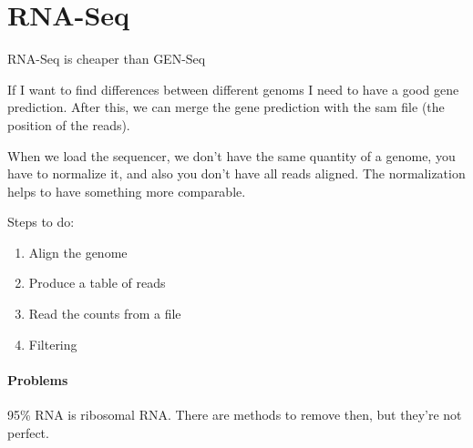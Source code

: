 \section{RNA-Seq}
RNA-Seq is cheaper than GEN-Seq


If I want to find differences between different genoms I need to have a good 
gene prediction. After this, we can merge the gene prediction with the sam file 
(the position of the reads).

When we load the sequencer, we don't have the same quantity of a genome, you 
have to normalize it, and also you don't have all reads aligned. The 
normalization helps to have something more comparable.

Steps to do:
\begin{enumerate}
	\item Align the genome
	\item Produce a table of reads
	\item Read the counts from a file
	\item Filtering
\end{enumerate}

\paragraph{Problems}
95\% RNA is ribosomal RNA. There are methods to remove then, but they're not 
perfect.

